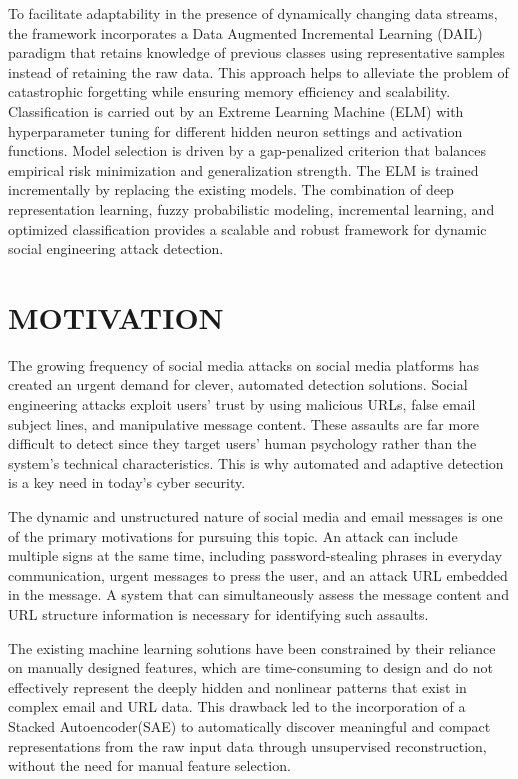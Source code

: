 To facilitate adaptability in the presence of dynamically changing data streams, the framework incorporates a Data Augmented Incremental Learning (DAIL) paradigm that retains knowledge of previous classes using representative samples instead of retaining the raw data. This approach helps to alleviate the problem of catastrophic forgetting while ensuring memory efficiency and scalability. Classification is carried out by an Extreme Learning Machine (ELM) with hyperparameter tuning for different hidden neuron settings and activation functions. Model selection is driven by a gap-penalized criterion that balances empirical risk minimization and generalization strength. The ELM is trained incrementally by replacing the existing models. The combination of deep representation learning, fuzzy probabilistic modeling, incremental learning, and optimized classification provides a scalable and robust framework for dynamic social engineering attack detection.


\section{MOTIVATION}
The growing frequency of social media attacks on social media platforms has created an urgent demand for clever, automated detection solutions. Social engineering attacks exploit users' trust by using malicious URLs, false email subject lines, and manipulative message content. These assaults are far more difficult to detect since they target users' human psychology rather than the system's technical characteristics. This is why automated and adaptive detection is a key need in today's cyber security.

The dynamic and unstructured nature of social media and email messages is one of the primary motivations for pursuing this topic. An attack can include multiple signs at the same time, including password-stealing phrases in everyday communication, urgent messages to press the user, and an attack URL embedded in the message. A system that can simultaneously assess the message content and URL structure information is necessary for identifying such assaults.

The existing machine learning solutions have been constrained by their reliance
on manually designed features, which are time-consuming to design and do not effectively represent the deeply hidden and nonlinear patterns that exist in complex email and URL data. This drawback led to the incorporation of a Stacked Autoencoder(SAE) to automatically discover meaningful and compact
representations from the raw input data through unsupervised reconstruction, without the need for manual feature selection.

